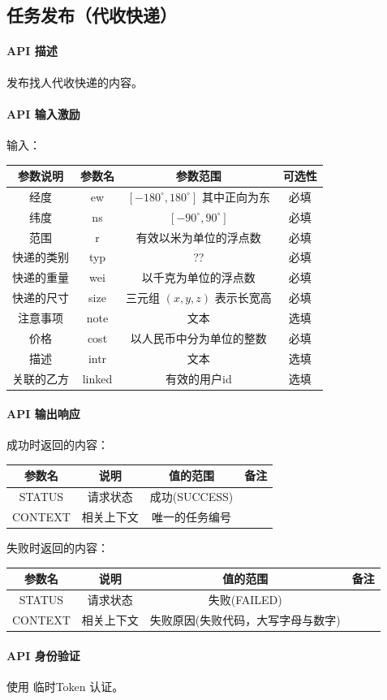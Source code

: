 \documentclass[UTF8]{article}
\def\apiintr{\paragraph{\colorbox[rgb]{1.0,0.6,0.65}{API 描述}}} %
\def\apiexc{\paragraph{\colorbox[rgb]{1,0.85,0.45}{API 输入激励}}} %
\def\apiresp{\paragraph{\colorbox[rgb]{0.9,0.9,1}{API 输出响应}}} %
\def\apiauth{\paragraph{\colorbox[rgb]{0.45,0.9,1}{API 身份验证}}} %
\def\失败{\colorbox[rgb]{1,0.5,0.5}{失败}}
\def\成功{\colorbox[rgb]{0.4,1,0.5}{成功}}
\def\成功V{成功(SUCCESS)}
\def\失败V{失败(FAILED)}
\def\失败原因{失败原因(失败代码，大写字母与数字)}
\begin{document}
    \subsection{任务发布（代收快递）}
    \apiintr
    发布找人代收快递的内容。
    \apiexc
    输入：\\
    \begin{tabular}{|c|c|c|c|}
        \hline \rule[-2ex]{0pt}{5.5ex} 参数说明 & 参数名 & 参数范围 & 可选性 \\
        \hline \rule[-2ex]{0pt}{5.5ex} 经度 & ew & $[-180^\circ,180^\circ]$ 其中正向为东 & 必填 \\
        \hline \rule[-2ex]{0pt}{5.5ex} 纬度 & ns & $[-90^\circ,90^\circ]$ & 必填 \\
        \hline \rule[-2ex]{0pt}{5.5ex} 范围 & r & 有效以米为单位的浮点数 & 必填 \\
        \hline \rule[-2ex]{0pt}{5.5ex} 快递的类别 & typ & ?? & 必填 \\
        \hline \rule[-2ex]{0pt}{5.5ex} 快递的重量 & wei & 以千克为单位的浮点数 & 必填 \\
        \hline \rule[-2ex]{0pt}{5.5ex} 快递的尺寸 & size & 三元组 $(x,y,z)$ 表示长宽高 & 必填 \\
        \hline \rule[-2ex]{0pt}{5.5ex} 注意事项 & note & 文本 & 选填 \\
        \hline \rule[-2ex]{0pt}{5.5ex} 价格 & cost & 以人民币中分为单位的整数 & 必填 \\
        \hline \rule[-2ex]{0pt}{5.5ex} 描述 & intr & 文本 & 选填 \\
        \hline \rule[-2ex]{0pt}{5.5ex} 关联的乙方 & linked & 有效的用户id & 选填 \\
        \hline 
    \end{tabular}
    \apiresp
    \成功 时返回的内容：\\
    \begin{tabular}{|c|c|c|c|}
        \hline \rule[-2ex]{0pt}{5.5ex} 参数名 & 说明 & 值的范围 & 备注 \\
        \hline \rule[-2ex]{0pt}{5.5ex} STATUS & 请求状态 & \成功V &  \\ 
        \hline \rule[-2ex]{0pt}{5.5ex} CONTEXT & 相关上下文 & 唯一的任务编号 &  \\
        \hline 
    \end{tabular} 
    \par \失败 时返回的内容：\\
    \begin{tabular}{|c|c|c|c|}
        \hline \rule[-2ex]{0pt}{5.5ex} 参数名 & 说明 & 值的范围 & 备注 \\
        \hline \rule[-2ex]{0pt}{5.5ex} STATUS & 请求状态 & \失败V &  \\ 
        \hline \rule[-2ex]{0pt}{5.5ex} CONTEXT & 相关上下文 & \失败原因 &  \\
        \hline 
    \end{tabular}
    \apiauth
    使用 临时Token 认证。
\end{document}
